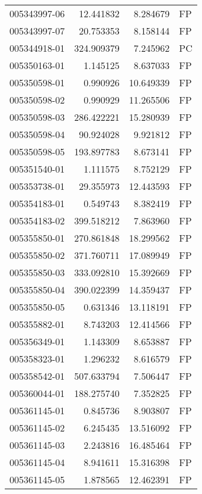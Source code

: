 \begin{tabular}{lrrl}
005343997-06 &   12.441832 &       8.284679 &   FP \\
005343997-07 &   20.753353 &       8.158144 &   FP \\
005344918-01 &  324.909379 &       7.245962 &   PC \\
005350163-01 &    1.145125 &       8.637033 &   FP \\
005350598-01 &    0.990926 &      10.649339 &   FP \\
005350598-02 &    0.990929 &      11.265506 &   FP \\
005350598-03 &  286.422221 &      15.280939 &   FP \\
005350598-04 &   90.924028 &       9.921812 &   FP \\
005350598-05 &  193.897783 &       8.673141 &   FP \\
005351540-01 &    1.111575 &       8.752129 &   FP \\
005353738-01 &   29.355973 &      12.443593 &   FP \\
005354183-01 &    0.549743 &       8.382419 &   FP \\
005354183-02 &  399.518212 &       7.863960 &   FP \\
005355850-01 &  270.861848 &      18.299562 &   FP \\
005355850-02 &  371.760711 &      17.089949 &   FP \\
005355850-03 &  333.092810 &      15.392669 &   FP \\
005355850-04 &  390.022399 &      14.359437 &   FP \\
005355850-05 &    0.631346 &      13.118191 &   FP \\
005355882-01 &    8.743203 &      12.414566 &   FP \\
005356349-01 &    1.143309 &       8.653887 &   FP \\
005358323-01 &    1.296232 &       8.616579 &   FP \\
005358542-01 &  507.633794 &       7.506447 &   FP \\
005360044-01 &  188.275740 &       7.352825 &   FP \\
005361145-01 &    0.845736 &       8.903807 &   FP \\
005361145-02 &    6.245435 &      13.516092 &   FP \\
005361145-03 &    2.243816 &      16.485464 &   FP \\
005361145-04 &    8.941611 &      15.316398 &   FP \\
005361145-05 &    1.878565 &      12.462391 &   FP \\

\end{tabular}
